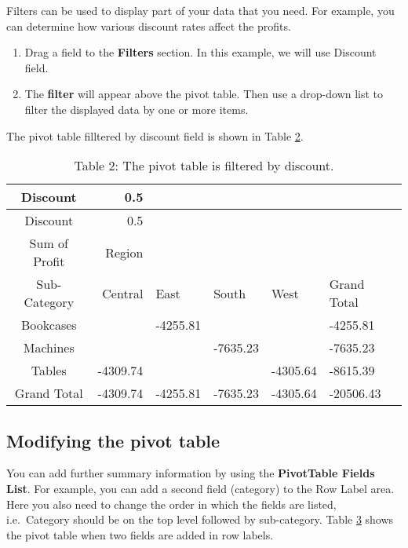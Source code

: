 \documentclass[
]{article}
\theoremstyle{definition}
\theoremstyle{definition}
\theoremstyle{definition}
\theoremstyle{definition}
\theoremstyle{remark}
\begin{document}
Filters can be used to display part of your data that you need. For
example, you can determine how various discount rates affect the
profits.

\begin{enumerate}
\def\labelenumi{\arabic{enumi}.}
\item
  Drag a field to the \textbf{Filters} section. In this example, we will
  use Discount field.
\item
  The \textbf{filter} will appear above the pivot table. Then use a
  drop-down list to filter the displayed data by one or more items.
\end{enumerate}

The pivot table filltered by discount field is shown in Table
\protect\hyperlink{Table2}{2}.

\hypertarget{Table2}{}
\begin{longtable}[]{@{}crllll@{}}
\caption{Table 2: The pivot table is filtered by discount.}\tabularnewline
\toprule
Discount & 0.5 & & & & \\
\midrule
\endfirsthead
\toprule
Discount & 0.5 & & & & \\
\midrule
\endhead
Sum of Profit & Region & & & & \\
Sub-Category & Central & East & South & West & Grand Total \\
Bookcases & & -4255.81 & & & -4255.81 \\
Machines & & & -7635.23 & & -7635.23 \\
Tables & -4309.74 & & & -4305.64 & -8615.39 \\
Grand Total & -4309.74 & -4255.81 & -7635.23 & -4305.64 & -20506.43 \\
\bottomrule
\end{longtable}

\hypertarget{modifying-the-pivot-table}{%
\subsection{Modifying the pivot table}\label{modifying-the-pivot-table}}

You can add further summary information by using the \textbf{PivotTable Fields
List}. For example, you can add a second field (category) to the Row
Label area. Here you also need to change the order in which the fields
are listed, i.e.~Category should be on the top level followed by
sub-category. Table \protect\hyperlink{Table3}{3} shows the pivot table when two fields are added in
row labels.
\end{document}
